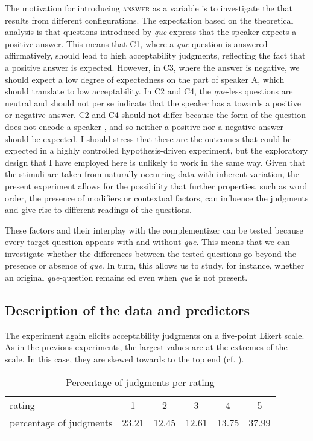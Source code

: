 The motivation for introducing \textsc{answer} as a variable is to investigate the  that results from different configurations. The expectation based on the theoretical analysis is that questions introduced by \emph{que} express that the speaker expects a positive answer. This means that C1, where a \emph{que}-question is answered affirmatively, should lead to high acceptability judgments, reflecting the fact that a positive answer is expected. However, in C3, where the answer is negative, we should expect a low degree of expectedness on the part of speaker A, which should translate to low acceptability. In C2 and C4,  the \emph{que}-less questions are neutral and should not per se indicate that the speaker has a  towards a positive or negative answer.   C2 and C4 should not differ because the form of the question does not encode a speaker , and so neither a positive nor a negative answer should be expected.   I should stress that these are the outcomes that could be expected in a highly controlled hypothesis-driven experiment, but the exploratory design that I have employed here is unlikely to work in the same way.  Given  that the stimuli are taken from naturally occurring data with  inherent variation, the present experiment  allows for the possibility that further properties, such as  word order, the presence of  modifiers or  contextual factors,  can influence the judgments and give rise to different readings of the questions. 

These factors and their interplay with the complementizer can be tested because every target question appears with and without \emph{que}. This means that we can investigate whether the differences between the tested questions go beyond the presence or absence of \emph{que}. In turn, this allows us to study, for instance, whether an original \emph{que}-question remains ed even when \emph{que} is not present.

\subsection{Description of the data and predictors}

The experiment again elicits acceptability judgments on a five-point Likert scale. As in the previous experiments, the largest values are at the extremes of the scale. In this case, they are skewed towards to the top end (cf. ). 


\begin{table}
	\begin{tabular}{l c c c c c}
		\lsptoprule
rating & 1&2&3&4&5\\
percentage of judgments & 23.21 & 12.45 & 12.61  & 13.75 & 37.99 \\ 
		\lspbottomrule
	\end{tabular}
\caption{Percentage of judgments per rating}\label{tab:judgcatbias}
\end{table}

